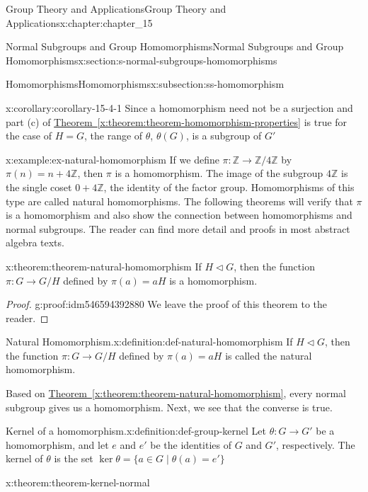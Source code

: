 \documentclass[oneside,10pt,]{book}
\newcommand{\xreffont}{\relax}
\numberwithin{equation}{section}
\begin{document}
\begin{chapterptx}{Group Theory and Applications}{}{Group Theory and Applications}{}{}{x:chapter:chapter_15}
\begin{sectionptx}{Normal Subgroups and Group Homomorphisms}{}{Normal Subgroups and Group Homomorphisms}{}{}{x:section:s-normal-subgroups-homomorphisms}
\begin{subsectionptx}{Homomorphisms}{}{Homomorphisms}{}{}{x:subsection:ss-homomorphism}
\begin{corollary}{}{}{x:corollary:corollary-15-4-1}%
Since a homomorphism need not be a surjection and part (c) of \hyperref[x:theorem:theorem-homomorphism-properties]{Theorem~{\xreffont\ref{x:theorem:theorem-homomorphism-properties}}} is true for the case of \(H = G\), the range of \(\theta\), \(\theta(G)\), is a subgroup of \(G'\)%
\end{corollary}
\begin{example}{}{x:example:ex-natural-homomorphism}%
If we define \(\pi: \mathbb{Z} \rightarrow  \mathbb{Z}/4\mathbb{Z}\) by \(\pi(n) = n + 4\mathbb{Z}\), then \(\pi\) is a homomorphism. The image of the subgroup \(4\mathbb{Z}\) is the single coset \(0 + 4\mathbb{Z}\), the identity of the factor group. Homomorphisms of this type are called natural homomorphisms.  The following theorems will verify that \(\pi\) is a homomorphism and also show the connection between homomorphisms and normal subgroups. The reader can find more detail and proofs in most abstract algebra texts.%
\end{example}
\begin{theorem}{}{}{x:theorem:theorem-natural-homomorphism}%
If \(H \triangleleft  G\), then the function \(\pi:G\to  G/H\) defined by \(\pi(a) = a H\) is a homomorphism.%
\end{theorem}
\begin{proof}{}{g:proof:idm546594392880}
We leave the proof of this theorem to the reader.%
\end{proof}
\begin{definition}{Natural Homomorphism.}{x:definition:def-natural-homomorphism}%
%
If \(H \triangleleft  G\), then the function \(\pi:G\to  G/H\) defined by \(\pi(a) = a H\) is called the natural homomorphism.%
\end{definition}
Based on \hyperref[x:theorem:theorem-natural-homomorphism]{Theorem~{\xreffont\ref{x:theorem:theorem-natural-homomorphism}}}, every normal subgroup gives us a homomorphism.  Next, we see that the converse is true.%
\begin{definition}{Kernel of a homomorphism.}{x:definition:def-group-kernel}%
%
\label{g:notation:idm546594385744}%
Let  \(\theta: G \to  G'\) be a homomorphism, and let \(e\) and \(e'\) be the identities of \(G\) and \(G'\), respectively. The kernel of \(\theta\) is the set \(\ker \theta=\{a\in G \mid \theta(a)=e'\}\)%
\end{definition}
\begin{theorem}{}{}{x:theorem:theorem-kernel-normal}%

\end{theorem}
\end{subsectionptx}
\end{sectionptx}
\end{chapterptx}
\end{document}
